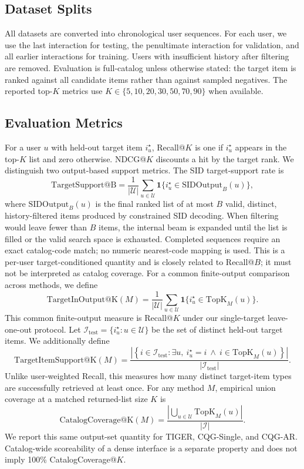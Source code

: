 \documentclass[letterpaper]{article}
\begin{document}
\subsection{Dataset Splits}
\label{app:splits}

All datasets are converted into chronological user sequences. For each user, we use the last interaction for testing, the penultimate interaction for validation, and all earlier interactions for training. Users with insufficient history after filtering are removed. Evaluation is full-catalog unless otherwise stated: the target item is ranked against all candidate items rather than against sampled negatives. The reported top-$K$ metrics use $K\in\{5,10,20,30,50,70,90\}$ when available.

\subsection{Evaluation Metrics}
\label{app:metrics}

For a user $u$ with held-out target item $i_u^\star$, Recall@$K$ is one if $i_u^\star$ appears in the top-$K$ list and zero otherwise. NDCG@$K$ discounts a hit by the target rank. We distinguish two output-based support metrics. The SID target-support rate is
\[
\mathrm{TargetSupport@B} =
\frac{1}{|\mathcal{U}|}
\sum_{u\in\mathcal{U}}
\mathbf{1}\{i_u^\star\in \mathrm{SIDOutput}_B(u)\},
\]
where $\mathrm{SIDOutput}_B(u)$ is the final ranked list of at most $B$
valid, distinct, history-filtered items produced by constrained SID decoding.
When filtering would leave fewer than $B$ items, the internal beam is expanded
until the list is filled or the valid search space is exhausted. Completed
sequences require an exact catalog-code match; no numeric nearest-code mapping
is used. This is a per-user target-conditioned quantity and is closely related
to Recall@$B$; it must not be interpreted as catalog coverage. For a common
finite-output comparison across methods, we define
\[
\mathrm{TargetInOutput@K}(M)=
\frac{1}{|\mathcal U|}
\sum_{u\in\mathcal U}
\mathbf{1}\{i_u^\star\in\mathrm{TopK}_M(u)\}.
\]
This common finite-output measure is Recall@$K$ under our single-target
leave-one-out protocol. Let
\(\mathcal I_{\mathrm{test}}=\{i_u^\star:u\in\mathcal U\}\) be the set of
distinct held-out target items. We additionally define
\[
\mathrm{TargetItemSupport@K}(M)=
\frac{
\left|\left\{i\in\mathcal I_{\mathrm{test}}:
\exists u,\ i_u^\star=i\ \land\ i\in\mathrm{TopK}_M(u)\right\}\right|
}{
|\mathcal I_{\mathrm{test}}|
}.
\]
Unlike user-weighted Recall, this measures how many distinct target-item types
are successfully retrieved at least once. For any method $M$, empirical union
coverage at a matched returned-list size $K$ is
\[
\mathrm{CatalogCoverage@K}(M)=
\frac{\left|\bigcup_{u\in\mathcal U}\mathrm{TopK}_M(u)\right|}
{|\mathcal I|}.
\]
We report this same output-set quantity for TIGER, CQG-Single, and CQG-AR. Catalog-wide scoreability of a dense interface is a separate property and does not imply 100\% CatalogCoverage@$K$.
\end{document}
